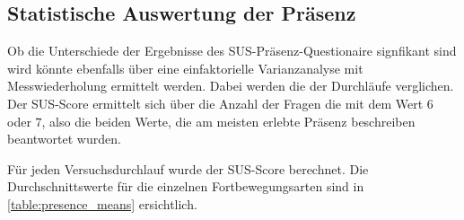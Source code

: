 
                \subsection{Statistische Auswertung der Präsenz}
                    Ob die Unterschiede der Ergebnisse des SUS-Präsenz-Questionaire signfikant sind wird könnte ebenfalls über eine einfaktorielle Varianzanalyse mit Messwiederholung ermittelt werden. Dabei werden die  der Durchläufe verglichen. Der SUS-Score ermittelt sich über die Anzahl der Fragen die mit dem Wert $6$ oder $7$, also die beiden Werte, die am meisten erlebte Präsenz beschreiben beantwortet wurden.

                    Für jeden Versuchsdurchlauf wurde der SUS-Score berechnet. Die Durchschnittswerte für die einzelnen Fortbewegungsarten sind in \autoref{table:presence_means} ersichtlich.

